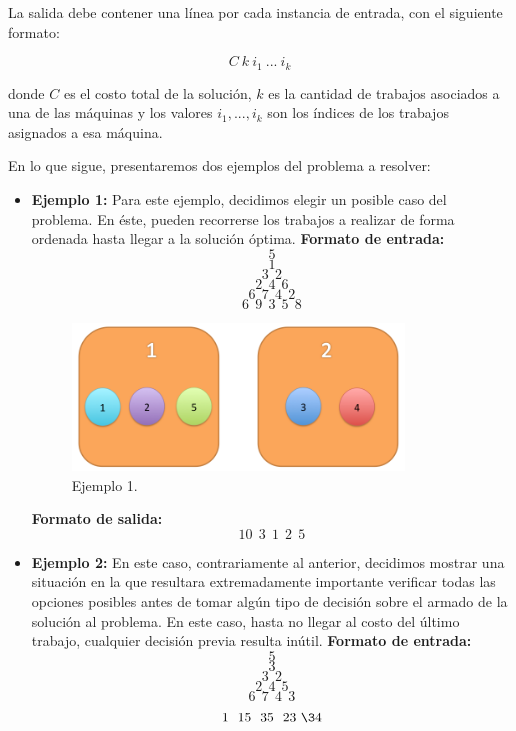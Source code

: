 La salida debe contener una línea por cada instancia de entrada, con el siguiente formato:

$$C\ k\ i_{1}\ ...\ i_{k}$$


donde \textbf{$C$} es el costo total de la solución, $k$ es la cantidad de trabajos asociados a una de las máquinas y los valores $i_{1},...,i_{k}$ son los índices de los trabajos asignados a esa máquina.\newline

En lo que sigue, presentaremos dos ejemplos del problema a resolver:
\begin{itemize}
\item {\large{\textbf{Ejemplo 1:}}}\newline
\newline
Para este ejemplo, decidimos elegir un posible caso del problema. En éste, pueden recorrerse los trabajos a realizar de forma ordenada hasta llegar a la solución óptima.\newline
\newline
\textbf{Formato de entrada:}
$$5$$
$$1$$
$$3\ \ 2$$
$$2\ \ 4\ \ 6$$
$$6\ \ 7\ \ 4\ \ 2$$
$$6\ \ 9\ \ 3\ \ 5\ \ 8$$

\begin{figure}[H] %
\begin{center}
\includegraphics[width=250pt]{../imgs/ejemplo1ej1.jpg}
\caption{Ejemplo 1.}
\end{center}
\end{figure}

\textbf{Formato de salida:}
$$10\ \ 3\ \ 1\ \ 2\ \ 5$$
\item {\large{\textbf{Ejemplo 2:}}}\newline
\newline
En este caso, contrariamente al anterior, decidimos mostrar una situación en la que resultara extremadamente importante verificar todas las opciones posibles antes de tomar algún tipo de decisión sobre el armado de la solución al problema. En este caso, hasta no llegar al costo del último trabajo, cualquier decisión previa resulta inútil.\newline
\newline
\textbf{Formato de entrada:}
$$5$$
$$3$$
$$3\ \ 2$$
$$2\ \ 4\ \ 5$$
$$6\ \ 7\ \ 4\ \ 3$$
$$1\ \ 15\ \ 35\ \ 23\ \34$$


\end{itemize}
